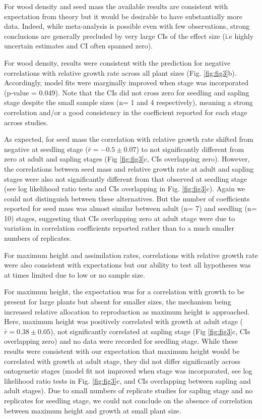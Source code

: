 \documentclass[a4paper,11pt]{article}
\begin{document}
For wood density and seed mass the available results are consistent with expectation from theory but it would be desirable to have substantially more data. Indeed, while meta-analysis is possible even with few observations, strong conclusions are generally precluded by very large CIs of the effect size (i.e highly uncertain estimates and CI often spanned zero).

For wood density, results were consistent with the prediction for negative correlations with relative growth rate across all plant sizes (Fig. \ref{fig:fig3}b). Accordingly, model fits were marginally improved when stage was incorporated (p-value = 0.049). Note that the CIs did not cross zero for seedling and sapling stage despite the small sample sizes (n= 1 and 4 respectively), meaning a strong correlation and/or a good consistency in the coefficient reported for each stage across studies.

As expected, for seed mass the correlation with relative growth rate shifted from negative at seedling stage ($\bar{r}= -0.5 \pm 0.07$) to not significantly different from zero at adult and sapling stages (Fig \ref{fig:fig3}c, CIs overlapping zero). However, the correlations between seed mass and relative growth rate at adult and sapling stages were also not significantly different from that observed at seedling stage (see log likelihood ratio tests and CIs overlapping in Fig. \ref{fig:fig3}c). Again we could not distinguish between these alternatives. But the number of coefficients reported for seed mass was almost similar between adult (n= 7) and seedling (n= 10) stages, suggesting that CIs overlapping zero at adult stage were due to variation in correlation coefficients reported rather than to a much smaller numbers of replicates.

For maximum height and assimilation rates, correlations with relative growth rate were also consistent with expectations but our ability to test all hypotheses was at times limited due to low or no sample size. 

For maximum height, the expectation was for a correlation with growth to be present for large plants but absent for smaller sizes, the mechanism being increased relative allocation to reproduction as maximum height is approached. Here, maximum height was positively correlated with growth at adult stage ($\bar{r}= 0.38 \pm 0.05$), not significantly correlated at sapling stage (Fig \ref{fig:fig3}c, CIs overlapping zero) and no data were recorded for seedling stage. While these results were consistent with our expectation that maximum height would be correlated with growth at adult stage, they did not differ significantly across ontogenetic stages (model fit not improved when stage was incorporated, see log likelihood ratio tests in Fig. \ref{fig:fig3}c, and CIs overlapping between sapling and adult stages). Due to small numbers of replicate studies for sapling stage and no replicates for seedling stage, we could not conclude on the absence of correlation between maximum height and growth at small plant size.
\end{document}
